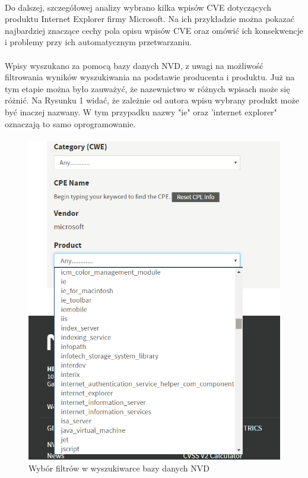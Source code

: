 \documentclass[a4paper,12pt,twoside]{article}
\begin{document}
\paragraph{}
Do dalszej, szczegółowej analizy wybrano kilka wpisów CVE dotyczących produktu Internet Explorer firmy Microsoft. Na ich przykładzie można pokazać najbardziej znaczące cechy pola opisu wpisów CVE oraz omówić ich konsekwencje i problemy przy ich automatycznym przetwarzaniu. 
\paragraph{}
Wpisy wyszukano za pomocą bazy danych NVD, z uwagi na możliwość filtrowania wyników wyszukiwania na podstawie producenta i produktu. Już na tym etapie można było zauważyć, że nazewnictwo w różnych wpisach może się różnić. Na Rysunku 1 widać, że zależnie od autora wpisu wybrany produkt może być inaczej nazwany. W tym przypadku nazwy "ie" oraz 'internet explorer" oznaczają to samo oprogramowanie. 


\paragraph{}
\begin{figure}[h]
    \centering
    \includegraphics[width=1.0\textwidth]{image/001NVDSearchResults.png}
    \caption{Wybór filtrów w wyszukiwarce bazy danych NVD}
\end{figure}
\end{document}
